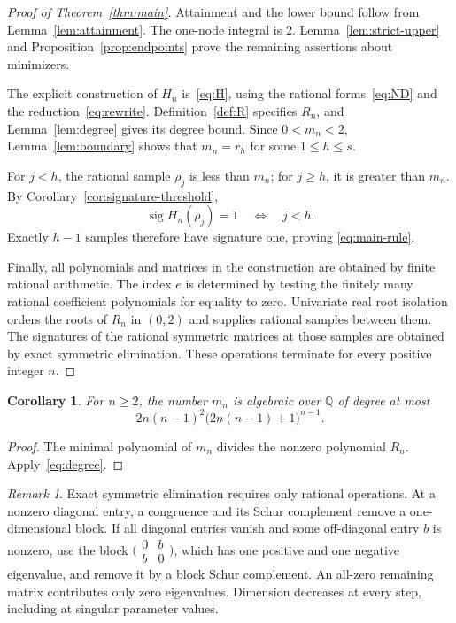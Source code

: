 \documentclass[11pt,leqno]{amsart}
\newtheorem{corollary}[theorem]{Corollary}
\theoremstyle{definition}
\theoremstyle{remark}
\newtheorem{remark}[theorem]{Remark}
\numberwithin{equation}{section}
\newcommand{\Q}{\mathbb Q}
\newcommand{\sig}{\operatorname{sig}}
\begin{document}
\begin{proof}[Proof of Theorem~\ref{thm:main}]
Attainment and the lower bound follow from Lemma~\ref{lem:attainment}.
The one-node integral is $2$. Lemma~\ref{lem:strict-upper} and
Proposition~\ref{prop:endpoints} prove the remaining assertions about
minimizers.

The explicit construction of $H_n$ is~\eqref{eq:H}, using the rational
forms~\eqref{eq:ND} and the reduction~\eqref{eq:rewrite}.
Definition~\ref{def:R} specifies $R_n$, and Lemma~\ref{lem:degree}
gives its degree bound. Since $0<m_n<2$, Lemma~\ref{lem:boundary}
shows that $m_n=r_h$ for some $1\leq h\leq s$.

For $j<h$, the rational sample $\rho_j$ is less than $m_n$; for
$j\geq h$, it is greater than $m_n$. By
Corollary~\ref{cor:signature-threshold},
\[
 \sig H_n(\rho_j)=1\quad\Longleftrightarrow\quad j<h.
\]
Exactly $h-1$ samples therefore have signature one, proving
\eqref{eq:main-rule}.

Finally, all polynomials and matrices in the construction are obtained
by finite rational arithmetic. The index $e$ is determined by testing
the finitely many rational coefficient polynomials for equality to
zero. Univariate real root isolation orders the roots of $R_n$ in
$(0,2)$ and supplies rational samples between them. The signatures
of the rational symmetric matrices at those samples are obtained by
exact symmetric elimination. These operations terminate for every
positive integer $n$.
\end{proof}

\begin{corollary}\label{cor:algebraic}
For $n\geq2$, the number $m_n$ is algebraic over $\Q$ of degree at most
\[
 2n(n-1)^2\bigl(2n(n-1)+1\bigr)^{n-1}.
\]
\end{corollary}

\begin{proof}
The minimal polynomial of $m_n$ divides the nonzero polynomial $R_n$.
Apply~\eqref{eq:degree}.
\end{proof}

\begin{remark}\label{rem:inertia}
Exact symmetric elimination requires only rational operations.
At a nonzero diagonal entry, a congruence and its Schur complement
remove a one-dimensional block. If all diagonal entries vanish and
some off-diagonal entry $b$ is nonzero, use the block
$\bigl(\begin{smallmatrix}0&b\\b&0\end{smallmatrix}\bigr)$, which has
one positive and one negative eigenvalue, and remove it by a block
Schur complement. An all-zero remaining matrix contributes only
zero eigenvalues. Dimension decreases at every step, including at
singular parameter values.
\end{remark}
\end{document}
